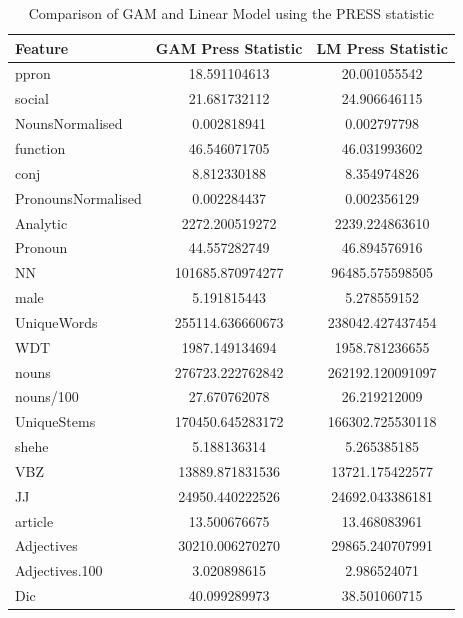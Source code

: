 \documentclass[10pt, letterpaper, twoside, openany]{thesis}
\begin{document}
\begin{table}[H]
	\begin{center}
	\begin{tabular}{ | l | c | c |}
		\hline
		Feature & GAM Press Statistic & LM Press Statistic \\ \hline
		ppron & 18.591104613 & 20.001055542 \\ \hline
		social & 21.681732112 & 24.906646115  \\ \hline
		NounsNormalised & 0.002818941 & 0.002797798\\ \hline
		function & 46.546071705 & 46.031993602 \\ \hline
		conj & 8.812330188 & 8.354974826 \\ \hline
		PronounsNormalised & 0.002284437 & 0.002356129\\ \hline
		Analytic & 2272.200519272 & 2239.224863610 \\ \hline
		Pronoun & 44.557282749 & 46.894576916 \\ \hline		
		NN & 101685.870974277 & 96485.575598505 \\ \hline
		male & 5.191815443 & 5.278559152 \\ \hline
		UniqueWords & 255114.636660673 & 238042.427437454 \\ \hline
		WDT & 1987.149134694 & 1958.781236655 \\ \hline
		nouns & 276723.222762842 & 262192.120091097 \\ \hline
		nouns/100 & 27.670762078 & 26.219212009 \\ \hline
		UniqueStems & 170450.645283172 & 166302.725530118 \\ \hline
		shehe & 5.188136314 & 5.265385185 \\ \hline
		VBZ & 13889.871831536 & 13721.175422577 \\ \hline
		JJ & 24950.440222526 & 24692.043386181 \\ \hline
		article & 13.500676675 & 13.468083961 \\ \hline	
		Adjectives & 30210.006270270 & 29865.240707991 \\ \hline	
		Adjectives.100 & 3.020898615 & 2.986524071 \\ \hline
		Dic & 40.099289973 & 38.501060715 \\ \hline	
	\end{tabular}
	\caption{\label{tab:table-name}Comparison of GAM and Linear Model using the PRESS statistic}
	\end{center} 
\end{table}
\end{document}
